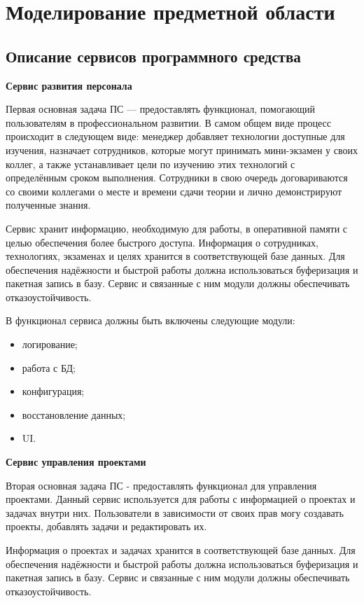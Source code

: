 \section{Моделирование предметной области}\label{sec:domain}

\subsection{Описание сервисов программного средства}\label{sec:domain:service}

\textbf{Сервис развития персонала}

Первая основная задача ПС — предоставлять функционал, помогающий пользователям в профессиональном развитии. В самом общем виде процесс происходит в следующем виде: менеджер добавляет технологии доступные для изучения, назначает сотрудников, которые могут принимать мини-экзамен у своих коллег, а также устанавливает цели по изучению этих технологий с определённым сроком выполнения. Сотрудники в свою очередь договариваются со своими коллегами о месте и времени сдачи теории и лично демонстрируют полученные знания.

Сервис хранит информацию, необходимую для работы, в оперативной памяти с целью обеспечения более быстрого доступа. Информация о сотрудниках, технологиях, экзаменах и целях хранится в соответствующей базе данных. Для обеспечения надёжности и быстрой работы должна использоваться буферизация и пакетная запись в базу. Сервис и связанные с ним модули должны обеспечивать отказоустойчивость.

В функционал сервиса должны быть включены следующие модули:
\begin{itemize}
    \item логирование;
    \item работа с БД;
    \item конфигурация;
    \item восстановление данных;
    \item UI.
\end{itemize}

\bigskip
\textbf{Сервис управления проектами}

Вторая основная задача ПС - предоставлять функционал для управления проектами. Данный сервис используется для работы с информацией о проектах и задачах внутри них. Пользователи в зависимости от своих прав могу создавать проекты, добавлять задачи и редактировать их.

Информация о проектах и задачах хранится в соответствующей базе данных. Для обеспечения надёжности и быстрой работы должна использоваться буферизация и пакетная запись в базу. Сервис и связанные с ним модули должны обеспечивать отказоустойчивость.

